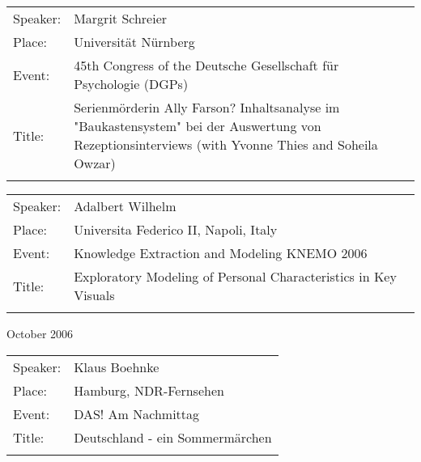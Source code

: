 {\begin{tabular}{lp{13.4cm}}
 Speaker:	&  Margrit Schreier\\
 Place: 	 &Universit\"{a}t N\"{u}rnberg\\
 Event:   &	45th Congress of the Deutsche Gesellschaft f\"{u}r Psychologie (DGPs)\\
 Title: &	Serienm\"{o}rderin Ally Farson? Inhaltsanalyse im "Baukastensystem" bei der Auswertung von Rezeptionsinterviews (with Yvonne Thies and Soheila Owzar)\\ \\
\end{tabular}
\begin{tabular}{lp{13.4cm}}
 Speaker:	&  	Adalbert Wilhelm\\
 Place: 	 &Universita Federico II, Napoli, Italy\\
 Event:   &	Knowledge Extraction and Modeling KNEMO 2006\\
 Title: &	Exploratory Modeling of Personal Characteristics in Key Visuals\\ \\
\end{tabular}




\begin{flushleft}
October 2006\\[0.5cm]
\end{flushleft}
\begin{tabular}{lp{13.4cm}}
 Speaker:	& Klaus Boehnke \\
 Place: 	 &Hamburg, NDR-Fernsehen\\
 Event:   &	DAS! Am Nachmittag\\
 Title: &	Deutschland - ein Sommerm\"{a}rchen\\ \\
\end{tabular}
	




}
